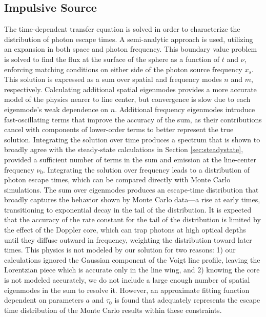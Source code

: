 \documentclass[linenumbers]{aastex63}
\begin{document}
\subsection{Impulsive Source}
The time-dependent transfer equation is solved in order to characterize the distribution of photon escape times. A semi-analytic approach is used, utilizing an expansion in both space and photon frequency. This boundary value problem is solved to find the flux at the surface of the sphere as a function of $t$ and $\nu$, enforcing matching conditions on either side of the photon source frequency $x_s$. This solution is expressed as a sum over spatial and frequency modes $n$ and $m$, respectively. Calculating additional spatial eigenmodes provides a more accurate model of the physics nearer to line center, but convergence is slow due to each eigenmode's weak dependence on $n$. Additional frequency eigenmodes introduce fast-oscillating terms that improve the accuracy of the sum, as their contributions cancel with components of lower-order terms to better represent the true solution. Integrating the solution over time produces a spectrum that is shown to broadly agree with the steady-state calculations in Section \ref{sec:steadystate}, provided a sufficient number of terms in the sum and emission at the line-center frequency $\nu_0$. Integrating the solution over frequency leads to a distribution of photon escape times, which can be compared directly with Monte Carlo simulations. The sum over eigenmodes produces an escape-time distribution that broadly captures the behavior shown by Monte Carlo data---a rise at early times, transitioning to exponential decay in the tail of the distribution. It is expected that the accuracy of the rate constant for the tail of the distribution is limited by the effect of the Doppler core, which can trap photons at high optical depths until they diffuse outward in frequency, weighting the distribution toward later times. This physics is not modeled by our solution for two reasons: 1) our calculations ignored the Gaussian component of the Voigt line profile, leaving the Lorentzian piece which is accurate only in the line wing, and 2) knowing the core is not modeled accurately, we do not include a large enough number of spatial eigenmodes in the sum to resolve it. However, an approximate fitting function dependent on parameters $a$ and $\tau_0$ is found that adequately represents the escape time distribution of the Monte Carlo results within these constraints.
\end{document}
